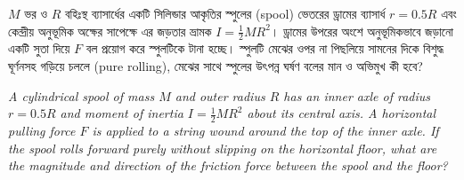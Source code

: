 \documentclass[12pt, a4paper]{article}
\begin{document}
{{\newpage

\begin{tcolorbox}[questionbox={প্রশ্ন (Question) 16}]
    \noindent
    $M$ ভর ও $R$ বহিঃস্থ ব্যাসার্ধের একটি সিলিন্ডার আকৃতির স্পুলের (spool) ভেতরের ড্রামের ব্যাসার্ধ $r = 0.5R$ এবং কেন্দ্রীয় অনুভূমিক অক্ষের সাপেক্ষে এর জড়তার ভ্রামক $I = \frac{1}{2} M R^2$। ড্রামের উপরের অংশে অনুভূমিকভাবে জড়ানো একটি সুতা দিয়ে $F$ বল প্রয়োগ করে স্পুলটিকে টানা হচ্ছে। স্পুলটি মেঝের ওপর না পিছলিয়ে সামনের দিকে বিশুদ্ধ ঘূর্ণনসহ গড়িয়ে চললে (pure rolling), মেঝের সাথে স্পুলের উৎপন্ন ঘর্ষণ বলের মান ও অভিমুখ কী হবে?
    
    \vspace{0.8em}
    \begin{english}
    \noindent\textit{\color{darkgray}
    A cylindrical spool of mass $M$ and outer radius $R$ has an inner axle of radius $r = 0.5R$ and moment of inertia $I = \frac{1}{2} M R^2$ about its central axis. A horizontal pulling force $F$ is applied to a string wound around the top of the inner axle. If the spool rolls forward purely without slipping on the horizontal floor, what are the magnitude and direction of the friction force between the spool and the floor?
    }
    \end{english}
\end{tcolorbox}

\vspace{1em}
\begin{center}
\end{center}
\vspace{1em}

}}
\end{document}
